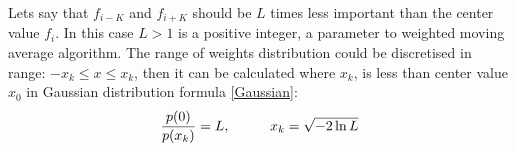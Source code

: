 \documentclass[a4paper,12pt,fleqn]{article}
\begin{document}
        Lets say that \begin{math}
            f_{i-K}
        \end{math} and \begin{math}
            f_{i+K}
        \end{math} 
        should be \begin{math}
            L
        \end{math} times less important than the center value \begin{math}
            f_i
        \end{math}. In this case \begin{math}
            L > 1
        \end{math} is a positive integer, a parameter to weighted moving
        average algorithm. The range of weights distribution could be 
        discretised in range: \begin{math}
            -x_k \leq x \leq x_k
        \end{math}, then it can be calculated where \begin{math}
            x_k \end{math}, is less than center value \begin{math}
                x_0 \end{math} in Gaussian distribution formula \ref{Gaussian}:
                \begin{gather}\label{Gaussian_discretised}
                    \frac{p(0)}{p(x_k)} = L, 
                    \hspace{1 cm} x_k = \sqrt{-2\ln{L}}
                \end{gather}
\end{document}
